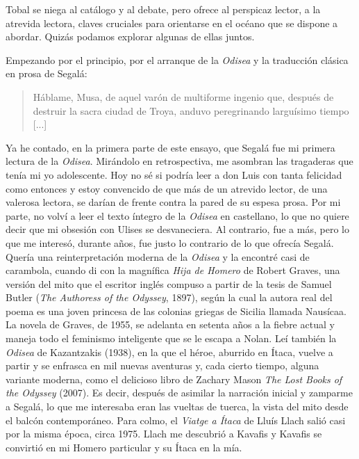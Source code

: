 \documentclass[11pt,a4paper]{article}
\begin{document}
Tobal se niega al catálogo y al debate, pero ofrece al perspicaz lector, a la atrevida lectora, claves cruciales para orientarse en el océano que se dispone a abordar. Quizás podamos explorar algunas de ellas juntos.

Empezando por el principio, por el arranque de la \emph{Odisea} y la traducción clásica en prosa de Segalá:

\begin{quotation}
Háblame, Musa, de aquel varón de multiforme ingenio que, después de destruir la sacra ciudad de Troya, anduvo peregrinando larguísimo tiempo [...]
\end{quotation}

Ya he contado, en la primera parte de este ensayo, que Segalá fue mi primera lectura de la \emph{Odisea}. Mirándolo en retrospectiva, me asombran las tragaderas que tenía mi yo adolescente. Hoy no sé si podría leer a don Luis con tanta felicidad como entonces y estoy convencido de que más de un atrevido lector, de una valerosa lectora, se darían de frente contra la pared de su espesa prosa. Por mi parte, no volví a leer el texto íntegro de la \emph{Odisea} en castellano, lo que no quiere decir que mi obsesión con Ulises se desvaneciera. Al contrario, fue a más, pero lo que me interesó, durante años, fue justo lo contrario de lo que ofrecía Segalá. Quería una reinterpretación moderna de la \emph{Odisea} y la encontré casi de carambola, cuando di con la magnífica \emph{Hija de Homero} de Robert Graves, una versión del mito que el escritor inglés compuso a partir de la tesis de Samuel Butler (\emph{The Authoress of the Odyssey}, 1897), según la cual la autora real del poema es una joven princesa de las colonias griegas de Sicilia llamada Nausícaa. La novela de Graves, de 1955, se adelanta en setenta años a la fiebre actual y maneja todo el feminismo inteligente que se le escapa a Nolan. Leí también la \emph{Odisea} de Kazantzakis (1938), en la que el héroe, aburrido en Ítaca, vuelve a partir y se enfrasca en mil nuevas aventuras y, cada cierto tiempo, alguna variante moderna, como el delicioso libro de Zachary Mason \emph{The Lost Books of the Odyssey} (2007). Es decir, después de asimilar la narración inicial y zamparme a Segalá, lo que me interesaba eran las vueltas de tuerca, la vista del mito desde el balcón contemporáneo. Para colmo, el \emph{Viatge a Ítaca} de Lluís Llach salió casi por la misma época, circa 1975. Llach me descubrió a Kavafis y Kavafis se convirtió en mi Homero particular y su Ítaca en la mía.
\end{document}
